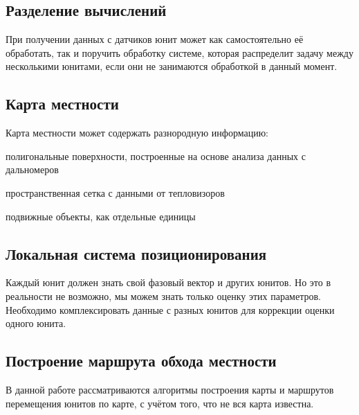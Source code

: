 \subsection{Разделение вычислений}

При получении данных с датчиков юнит может как самостоятельно
её обработать, так и поручить обработку системе, которая
распределит задачу между несколькими юнитами, если они не
занимаются обработкой в данный момент.

\subsection{Карта местности}

Карта местности может содержать разнородную информацию:
\begin{mintemize}
    \item полигональные поверхности, построенные на основе анализа
        данных с дальномеров
    \item пространственная сетка с данными от тепловизоров
    \item подвижные объекты, как отдельные единицы
\end{mintemize}

\subsection{Локальная система позиционирования}

Каждый юнит должен знать свой фазовый вектор и других юнитов.
Но это в реальности не возможно, мы можем знать только
оценку этих параметров. Необходимо комплексировать данные с разных
юнитов для коррекции оценки одного юнита.

\subsection{Построение маршрута обхода местности}

В данной работе рассматриваются алгоритмы построения
карты и маршрутов перемещения юнитов по карте, с учётом того,
что не вся карта известна.
